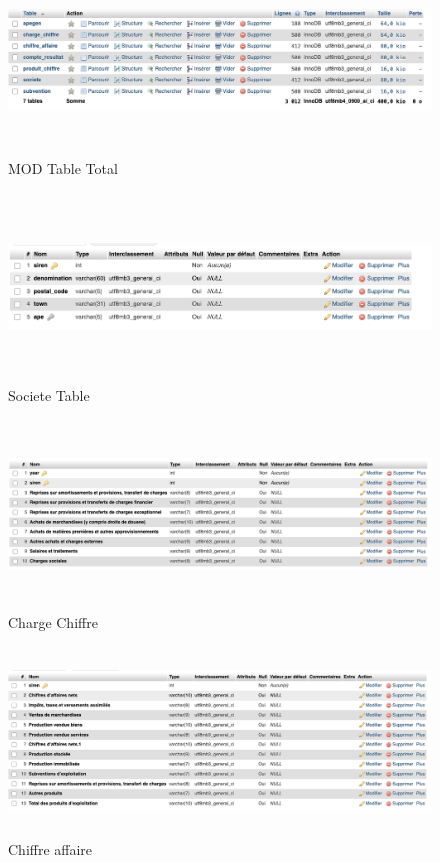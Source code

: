 \documentclass[mstat,12pt]{unswthesis}
\begin{document}
\begin{figure}
\centering
\includegraphics[width=15cm,height=5cm]{image_sql/mcd_totat.png}
\caption{MOD Table Total}\label{MOD_total}
\end{figure}

\begin{figure}
\centering
\includegraphics[width=15cm,height=5cm]{image_sql/societe.png}
\caption{Societe Table}\label{Societe}
\end{figure}

\begin{figure}
\centering
\includegraphics[width=15cm,height=5cm]{image_sql/charge_chiffre.png}
\caption{Charge Chiffre}\label{charge_chiffre}
\end{figure}

\begin{figure}
\centering
\includegraphics[width=15cm,height=5cm]{image_sql/chiffre_affaire.png}
\caption{Chiffre affaire}\label{Chiffre_affaire}
\end{figure}
\end{document}
